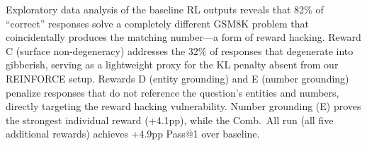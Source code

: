 Exploratory data analysis of the baseline RL outputs reveals that 82\% of ``correct'' responses solve a completely different GSM8K problem that coincidentally produces the matching number---a form of reward hacking.
Reward C (surface non-degeneracy) addresses the 32\% of responses that degenerate into gibberish, serving as a lightweight proxy for the KL penalty absent from our REINFORCE setup.
Rewards D (entity grounding) and E (number grounding) penalize responses that do not reference the question's entities and numbers, directly targeting the reward hacking vulnerability.
Number grounding (E) proves the strongest individual reward (+4.1pp), while the Comb.\ All run (all five additional rewards) achieves +4.9pp Pass@1 over baseline.
